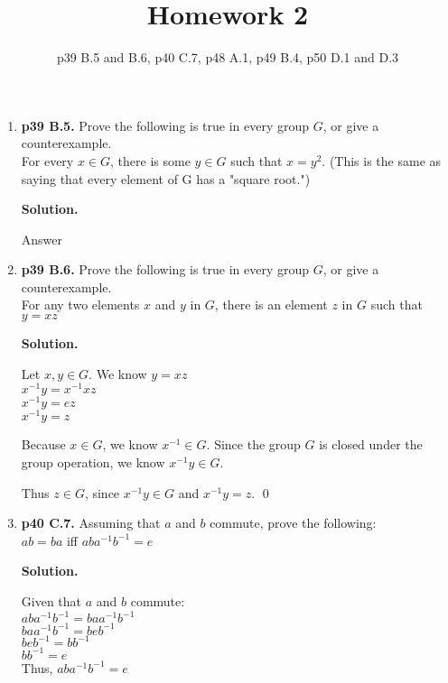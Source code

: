 \documentclass[11pt]{article}
\begin{document}
\title{Homework 2}
\date{p39 B.5 and B.6, p40 C.7, p48 A.1, p49 B.4, p50 D.1 and D.3}
\maketitle

\thispagestyle{fancy}  
\pagestyle{fancy}      

\begin{enumerate}

\item {\bfseries p39 B.5.} Prove the following is true in every group $G$, or give a counterexample. \\
  For every $x \in G$, there is some $y \in G$ such that $x = y^2$. (This is the same as saying that every element of G has a "square root.")
  
  {\bfseries Solution.}
  
  Answer \\
 
\item {\bfseries p39 B.6.} Prove the following is true in every group $G$, or give a counterexample. \\
  For any two elements $x$ and $y$ in $G$, there is an element $z$ in $G$ such that $y = xz$
  
  {\bfseries Solution.}
  
  Let $x, y \in G$. We know $y = xz$ \\
  $x^{-1}y = x^{-1}xz$ \\
  $x^{-1}y = ez$ \\
  $x^{-1}y = z$
  
  Because $x \in G$, we know $x^{-1} \in G$. Since the group $G$ is closed under the group operation, we know $x^{-1}y \in G$.
  
  Thus $z \in G$, since $x^{-1}y \in G$ and $x^{-1}y = z$. \qed \\

\item {\bfseries p40 C.7.} Assuming that $a$ and $b$ commute, prove the following: \\
  $ab = ba$ iff $aba^{-1}b^{-1} = e$
  
  {\bfseries Solution.}
  
  Given that $a$ and $b$ commute: \\
  $aba^{-1}b^{-1} = baa^{-1}b^{-1}$ \\
  $baa^{-1}b^{-1} = beb^{-1}$ \\
  $beb^{-1} = bb^{-1}$ \\
  $bb^{-1} = e$ \\
  Thus, $aba^{-1}b^{-1} = e$
  

\end{enumerate}
\end{document}
